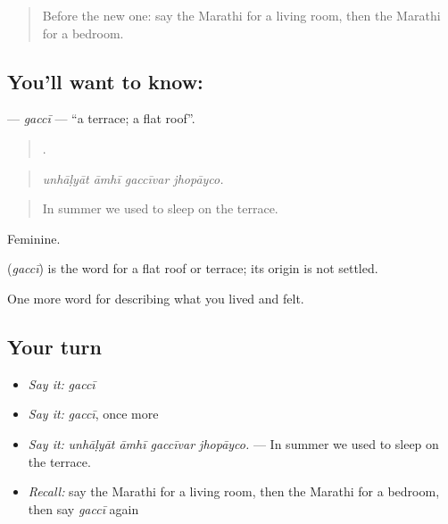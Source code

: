 \label{lesson:MR-C522-gacci}



\begin{quote}
Before the new one: say the Marathi for a living room, then the Marathi for a bedroom.
\end{quote}

\subsection*{You'll want to know: }
\textbf{} — \emph{gaccī} — \textquotedblleft{}a terrace; a flat roof\textquotedblright{}.

\begin{quote}
   .
\end{quote}

\begin{quote}
\emph{unhāḷyāt āmhī gaccīvar jhopāyco.}
\end{quote}

\begin{quote}
In summer we used to sleep on the terrace.
\end{quote}

Feminine.

\begin{cousinweb}
\textbf{} (\emph{gaccī}) is the word for a flat roof or terrace; its origin is not settled.
\end{cousinweb}

\begin{grammarlens}[title={What you've built}]
One more word for describing what you lived and felt.
\end{grammarlens}

\subsection*{Your turn}
\begin{itemize}
\raggedright
  \item \emph{Say it:} \emph{gaccī}
  \item \emph{Say it:} \emph{gaccī}, once more
  \item \emph{Say it:} \emph{unhāḷyāt āmhī gaccīvar jhopāyco.} — In summer we used to sleep on the terrace.
  \item \emph{Recall:} say the Marathi for a living room, then the Marathi for a bedroom, then say \emph{gaccī} again
\end{itemize}

